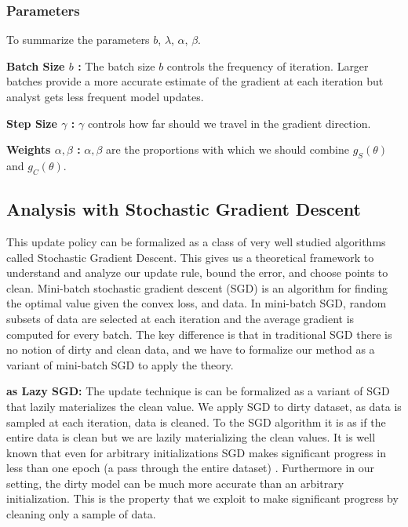 \subsubsection{Parameters}\label{params}
To summarize the parameters $b$, $\lambda$, $\alpha$, $\beta$.

\vspace{0.25em}

\noindent\textbf{Batch Size $b$ : } The batch size $b$ controls the frequency of iteration. Larger batches provide a more accurate estimate of the gradient at each iteration but analyst gets less frequent model updates. 

\vspace{0.25em}

\noindent\textbf{Step Size $\gamma$ : } $\gamma$ controls how far should we travel in the gradient direction.

\vspace{0.25em}

\noindent\textbf{Weights $\alpha,\beta$ : } $\alpha,\beta$ are the proportions with which we should combine $g_S(\theta)$ and $g_C(\theta)$. 

\subsection{Analysis with Stochastic Gradient Descent}\label{sgd}
This update policy can be formalized as a class of very well studied algorithms called Stochastic Gradient Descent.
This gives us a theoretical framework to understand and analyze our update rule, bound the error, and choose points to clean.
Mini-batch stochastic gradient descent (SGD) is an algorithm for finding the optimal value
given the convex loss, and data.
In mini-batch SGD, random subsets of data are selected at each iteration and the average gradient is computed for every batch.
The key difference is that in traditional SGD there is no notion of dirty and clean data, and we have to formalize our method as a variant of mini-batch SGD to apply the theory.

\vspace{0.25em}

\noindent\textbf{ \sys as Lazy SGD: } The update technique is \sys can be formalized as a variant of SGD that lazily materializes the clean value.
We apply SGD to dirty dataset, as data is sampled at each iteration, data is cleaned.
To the SGD algorithm it is as if the entire data is clean but we are lazily materializing the clean values.
It is well known that even for arbitrary initializations SGD makes significant progress in less than one epoch (a pass through the entire dataset) \cite{bottou2012stochastic}.
Furthermore in our setting, the dirty model can be much more accurate than an arbitrary initialization.
This is the property that we exploit to make significant progress by cleaning only a sample of data.

